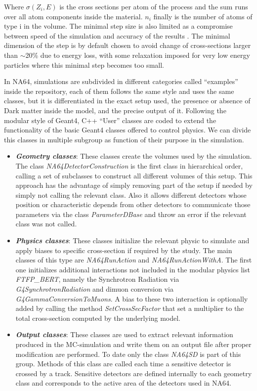 Where $\sigma(Z_i,E)$ is the cross sections per atom of the process and the sum runs over all atom components inside the material. $n_i$ finally is the number of atoms of type i in the volume. The minimal step size is also limited as a compromise between speed of the simulation and accuracy of the results \cite{geant4-phys-guide}. The minimal dimension of the step is by default chosen to avoid change of cross-sections larger than $\sim$20\% due to energy loss, with some relaxation imposed for very low energy particles where this minimal step becomes too small.

In NA64, simulations are subdivided in different categories called ``examples'' inside the repository, each of them follows the same style and uses the same classes, but it is differentiated in the exact setup used, the presence or absence of Dark matter inside the model, and the precise output of it. Following the modular style of Geant4, C++ ``User'' classes are coded to extend the functionality of the basic Geant4 classes offered to control physics. We can divide this classes in multiple subgroup as function of their purpose in the simulation.

\begin{itemize}
\item \textbf{\textit{Geometry classes}}: These classes create the volumes used by the simulation. The class \textit{NA64DetectorConstruction} is the first class in hierarchical order, calling a set of subclasses to construct all different volumes of this setup. This approach has the advantage of simply removing part of the setup if needed by simply not calling the relevant class. Also it allows different detectors whose position or characteristic depends from other detectors to communicate those parameters via the class \textit{ParameterDBase} and throw an error if the relevant class was not called.
\item \textbf{\textit{Physics classes}}: These classes initialize the relevant physic to simulate and apply biases to specific cross-section if required by the study. The main classes of this type are \textit{NA64RunAction} and \textit{NA64RunActionWithA}. The first one initializes additional interactions not included in the modular physics list \textit{FTFP\_BERT}, namely the Synchrotron Radiation via \textit{G4SynchrotronRadiation} and dimuon conversion via \textit{G4GammaConversionToMuons}. A bias to these two interaction is optionally added by calling the method \textit{SetCrossSecFactor} that set a multiplier to the total cross-section computed by the underlying model.
\item \textbf{\textit{Output classes}}: These classes are used to extract relevant information produced in the MC-simulation and write them on an output file after proper modification are performed. To date only the class \textit{NA64SD} is part of this group. Methods of this class are called each time a sensitive detector is crossed by a track. Sensitive detectors are defined internally to each geometry class and corresponds to the active area of the detectors used in NA64.
\end{itemize}


